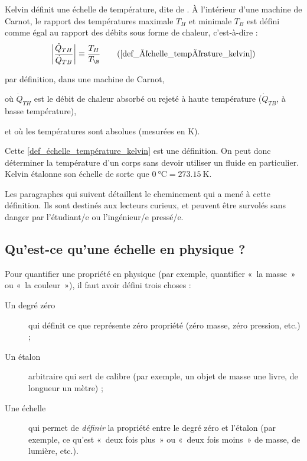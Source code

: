 		Kelvin définit une échelle de température, dite de . À l’intérieur d’une machine de Carnot, le rapport des températures maximale $T_H$ et minimale $T_B$ est défini comme égal au rapport des débits sous forme de chaleur, c’est-à-dire :
		\begin{equation}
			\left| \frac{\dot Q_{TH}}{\dot Q_{TB}} \right| \equiv  \frac{T_H}{T_\B } \tag{\ref{def_échelle_température_kelvin}}
		\end{equation}
		\begin{equationterms}
			\item par définition, dans une machine de Carnot,
			\item où \tab $\dot Q_{TH}$ \tab est le débit de chaleur absorbé ou rejeté à haute température ($\dot Q_{TB}$, à basse température),
			\item et où les températures sont absolues (mesurées en \si{\kelvin}).
		\end{equationterms}

		Cette \cref{def_échelle_température_kelvin} est une définition. On peut donc déterminer la température d’un corps sans devoir utiliser un fluide en particulier. Kelvin étalonne son échelle de sorte que $\SI{0}{\degreeCelsius} = \SI{273,15}{\kelvin}$. 
		
		Les paragraphes qui suivent détaillent le cheminement qui a mené à cette définition. Ils sont destinés aux lecteurs curieux, et peuvent être survolés sans danger par l’étudiant/e ou l’ingénieur/e pressé/e. 


	\subsection{Qu’est-ce qu’une échelle en physique ?}
	
		Pour quantifier une propriété en physique (par exemple, quantifier «~la masse~» ou «~la couleur~»), il faut avoir défini trois choses :
		
		\begin{description}
			\item [Un degré zéro] qui définit ce que représente zéro propriété (zéro masse, zéro pression, etc.) ;
			\item [Un étalon] arbitraire qui sert de calibre (par exemple, un objet de masse une livre, de longueur un mètre) ;
			\item [Une échelle] qui permet de \emph{définir} la propriété entre le degré zéro et l’étalon (par exemple, ce qu’est «~deux fois plus~» ou «~deux fois moins~» de masse, de lumière, etc.).
		\end{description}


